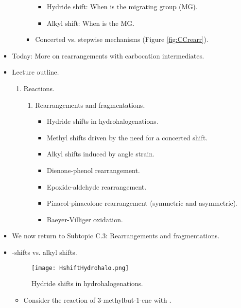 \documentclass[../notes.tex]{subfiles}
\begin{document}
\begin{itemize}
\begin{itemize}
\begin{itemize}
\begin{itemize}
                \item Hydride shift: When  is the migrating group (MG).
                \item Alkyl shift: When  is the MG.
            \end{itemize}
            \item Concerted vs. stepwise mechanisms (Figure \ref{fig:CCrearr}).
        \end{itemize}
    \end{itemize}
    \item Today: More on rearrangements with carbocation intermediates.
    \item Lecture outline.
    \begin{enumerate}[label={\Alph*.},start=3]
        \item Reactions.
        \begin{enumerate}[label={\arabic*)},start=3]
            \item Rearrangements and fragmentations.
            \begin{itemize}
                \item Hydride shifts in hydrohalogenations.
                \item Methyl shifts driven by the need for a concerted shift.
                \item Alkyl shifts induced by angle strain.
                \item Dienone-phenol rearrangement.
                \item Epoxide-aldehyde rearrangement.
                \item Pinacol-pinacolone rearrangement (symmetric and asymmetric).
                \item Baeyer-Villiger oxidation.
            \end{itemize}
        \end{enumerate}
    \end{enumerate}
    \item We now return to Subtopic C.3: Rearrangements and fragmentations.
    \item {}-shifts vs. alkyl shifts.
    \begin{figure}[H]
        \centering
        \texttt{[image: HshiftHydrohalo.png]}
        \caption{Hydride shifts in hydrohalogenations.}
        \label{fig:HshiftHydrohalo}
    \end{figure}
    \begin{itemize}
        \item Consider the reaction of 3-methylbut-1-ene with .

\end{itemize}
\end{itemize}
\end{document}
